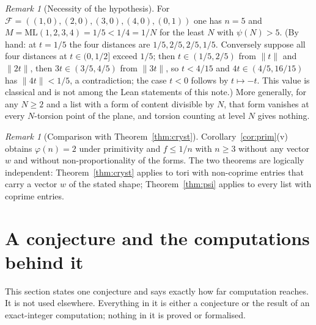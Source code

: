 \documentclass[11pt]{amsart}
\theoremstyle{definition}
\theoremstyle{remark}
\newtheorem{remark}[theorem]{Remark}
\newcommand{\dist}[1]{\lVert #1\rVert}
\newcommand{\ML}{\mathrm{ML}}
\begin{document}
\begin{remark}[Necessity of the hypothesis]\label{rem:necessity}
For $\mathcal F=((1,0),(2,0),(3,0),(4,0),(0,1))$ one has $n=5$ and $M=\ML(1,2,3,4)=1/5<1/4=1/N$ for the least $N$ with $\psi(N)>5$. (By hand: at $t=1/5$ the four distances are $1/5,2/5,2/5,1/5$. Conversely suppose all four distances at $t\in(0,1/2]$ exceed $1/5$; then $t\in(1/5,2/5)$ from $\dist t$ and $\dist{2t}$, then $3t\in(3/5,4/5)$ from $\dist{3t}$, so $t<4/15$ and $4t\in(4/5,16/15)$ has $\dist{4t}<1/5$, a contradiction; the case $t<0$ follows by $t\mapsto-t$. This value is classical and is not among the Lean statements of this note.) More generally, for any $N\ge2$ and a list with a form of content divisible by $N$, that form vanishes at every $N$-torsion point of the plane, and torsion counting at level $N$ gives nothing.
\end{remark}

\begin{remark}[Comparison with Theorem~\ref{thm:cryst}]
Corollary~\ref{cor:prim}(v) obtains $\varphi(n)=2$ under primitivity and $f\le1/n$ with $n\ge3$ without any vector $w$ and without non-proportionality of the forms. The two theorems are logically independent: Theorem~\ref{thm:cryst} applies to tori with non-coprime entries that carry a vector $w$ of the stated shape; Theorem~\ref{thm:psi} applies to every list with coprime entries.
\end{remark}

\section{A conjecture and the computations behind it}\label{sec:conj}

This section states one conjecture and says exactly how far computation reaches. It is not used elsewhere. Everything in it is either a conjecture or the result of an exact-integer computation; nothing in it is proved or formalised.
\end{document}
